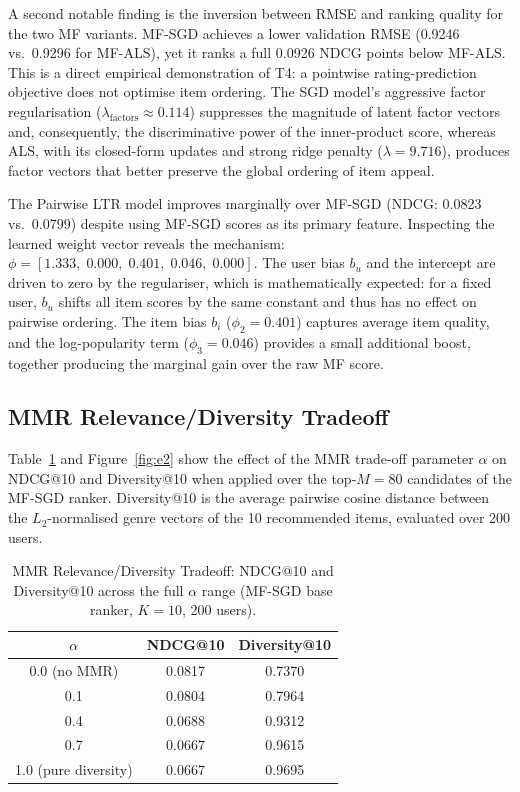 \documentclass[11pt]{article}
\begin{document}
\noindent A second notable finding is the inversion between RMSE and ranking quality for the two MF variants. MF-SGD achieves a lower validation RMSE (0.9246 vs.\ 0.9296 for MF-ALS), yet it ranks a full 0.0926 NDCG points below MF-ALS. This is a direct empirical demonstration of T4: a pointwise rating-prediction objective does not optimise item ordering. The SGD model's aggressive factor regularisation ($\lambda_{\text{factors}} \approx 0.114$) suppresses the magnitude of latent factor vectors and, consequently, the discriminative power of the inner-product score, whereas ALS, with its closed-form updates and strong ridge penalty ($\lambda = 9.716$), produces factor vectors that better preserve the global ordering of item appeal.

\noindent The Pairwise LTR model improves marginally over MF-SGD (NDCG: 0.0823 vs.\ 0.0799) despite using MF-SGD scores as its primary feature. Inspecting the learned weight vector reveals the mechanism: $\phi = [1.333,\; 0.000,\; 0.401,\; 0.046,\; 0.000]$. The user bias $b_u$ and the intercept are driven to zero by the regulariser, which is mathematically expected: for a fixed user, $b_u$ shifts all item scores by the same constant and thus has no effect on pairwise ordering. The item bias $b_i$ ($\phi_2 = 0.401$) captures average item quality, and the log-popularity term ($\phi_3 = 0.046$) provides a small additional boost, together producing the marginal gain over the raw MF score.

\subsection{MMR Relevance/Diversity Tradeoff}
\label{sec:e2}

\noindent Table~\ref{tab:e2} and Figure~\ref{fig:e2} show the effect of the MMR trade-off parameter $\alpha$ on NDCG@10 and Diversity@10 when applied over the top-$M = 80$ candidates of the MF-SGD ranker. Diversity@10 is the average pairwise cosine distance between the $L_2$-normalised genre vectors of the 10 recommended items, evaluated over 200 users.

\begin{table}[H]
\centering
\caption{MMR Relevance/Diversity Tradeoff: NDCG@10 and Diversity@10 across the full $\alpha$ range (MF-SGD base ranker, $K=10$, 200 users).}
\label{tab:e2}
\begin{tabular}{ccc}
\toprule
$\alpha$             & \textbf{NDCG@10} & \textbf{Diversity@10} \\
\midrule
0.0 (no MMR)         & 0.0817           & 0.7370                \\
0.1                  & 0.0804           & 0.7964                \\
0.4                  & 0.0688           & 0.9312                \\
0.7                  & 0.0667           & 0.9615                \\
1.0 (pure diversity) & 0.0667           & 0.9695                \\
\bottomrule
\end{tabular}
\end{table}
\end{document}
